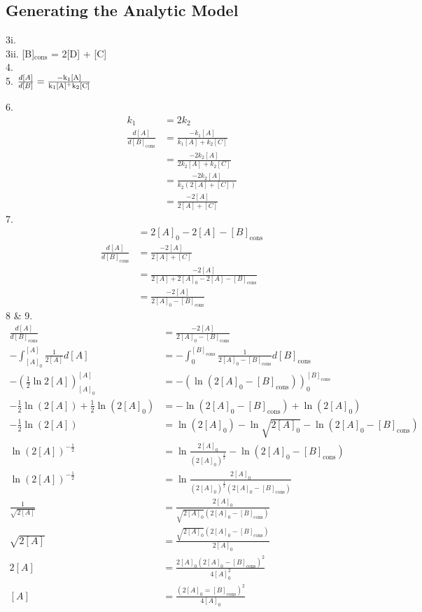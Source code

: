 \documentclass[twoside, 11pt]{article}
\begin{document}
\subsection{Generating the Analytic Model}
3i. \\
3ii. [B]$_\text{cons}$ = 2[D] + [C]\\
4. \\
5. $\frac{d[A]}{d[B]}=\frac{-\ce{k_1[A]}}{\ce{k_1[A]+k_2[C]}}$\\
\begin{multicols}{2}
6.
\begin{align*}
    k_1 &= 2k_2\\
    \frac{d[A]}{d[B]_\text{cons}} &= \frac{-k_1[A]}{k_1[A]+k_2[C]}\\
    &= \frac{-2k_2[A]}{2k_2[A] + k_2[C]}\\
    &= \frac{-2k_2[A]}{k_2(2[A]+[C])}\\
    &= \frac{-2[A]}{2[A]+[C]}
\end{align*}
7.
\begin{align*}
    [C] &= 2[A]_0 - 2[A] - [B]_\text{cons}\\
    \frac{d[A]}{d[B]_\text{cons}} &=\frac{-2[A]}{2[A]+[C]}\\
    &= \frac{-2[A]}{2[A] + 2[A]_0 - 2[A] - [B]_\text{cons}}\\
    &= \frac{-2[A]}{2[A]_0 - [B]_\text{cons}}
\end{align*}
8 \& 9.
\begin{align*}
    \frac{d[A]}{d[B]_\text{cons}} &= \frac{-2[A]}{2[A]_0 - [B]_\text{cons}}\\
    -\int^{[A]}_{[A]_0} \frac{1}{2[A]} d[A] &= -\int^{[B]_\text{cons}}_0 \frac{1}{2[A]_0 - [B]_\text{cons}} d[B]_\text{cons}\\
    -(\frac{1}{2}\ln2[A])^{[A]}_{[A]_0} &= -(\ln(2[A]_0 - [B]_\text{cons}))^{[B]_\text{cons}}_0\\
    -\frac{1}{2}\ln(2[A]) + \frac{1}{2}\ln(2[A]_0) &= -\ln(2[A]_0 - [B]_\text{cons}) + \ln(2[A]_0)\\
    -\frac{1}{2}\ln(2[A]) &= \ln(2[A]_0) - \ln\sqrt{2[A]_0} - \ln(2[A]_0 - [B]_\text{cons})\\
    \ln(2[A])^{-\frac{1}{2}} &= \ln\frac{2[A]_0}{(2[A]_0)^{\frac{1}{2}}} - \ln(2[A]_0 - [B]_\text{cons})\\
    \ln(2[A])^{-\frac{1}{2}} &= \ln\frac{2[A]_0}{(2[A]_0)^\frac{1}{2}(2[A]_0-[B]_\text{cons})}\\
    \frac{1}{\sqrt{2[A]}} &= \frac{2[A]_0}{\sqrt{2[A]_0}(2[A]_0-[B]_\text{cons})}\\
    \sqrt{2[A]} &= \frac{\sqrt{2[A]_0}(2[A]_0-[B]_\text{cons})}{2[A]_0}\\
    2[A] &= \frac{2[A]_0(2[A]_0-[B]_\text{cons})^{2}}{4[A]_0^{2}}\\
    [A] &= \frac{(2[A]_0 = [B]_\text{cons})^{2}}{4[A]_0}
\end{align*}
\end{multicols}
\end{document}
